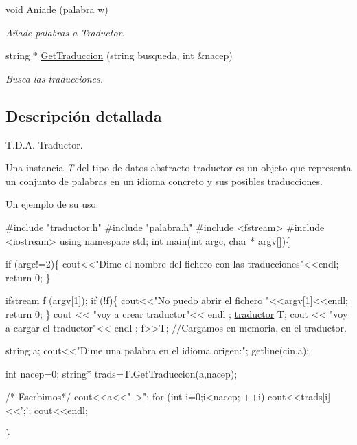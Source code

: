 \begin{DoxyCompactItemize}
void \hyperlink{classtraductor_a7720fe5824d82064b1479ffcc761020e}{Aniade} (\hyperlink{classpalabra}{palabra} w)
\begin{DoxyCompactList}\small\item\em Añade palabras a Traductor. \end{DoxyCompactList}\item 
string $\ast$ \hyperlink{classtraductor_a62c1d8dde134e9122c7172fa6f611e13}{Get\-Traduccion} (string busqueda, int \&nacep)
\begin{DoxyCompactList}\small\item\em Busca las traducciones. \end{DoxyCompactList}\end{DoxyCompactItemize}


\subsection{Descripción detallada}
T.\-D.\-A. Traductor. 

Una instancia {\itshape T} del tipo de datos abstracto {\ttfamily traductor} es un objeto que representa un conjunto de palabras en un idioma concreto y sus posibles traducciones.

Un ejemplo de su uso\-: 
\begin{DoxyCodeInclude}
\textcolor{preprocessor}{#include "\hyperlink{traductor_8h}{traductor.h}"}
\textcolor{preprocessor}{#include "\hyperlink{palabra_8h}{palabra.h}"}
\textcolor{preprocessor}{#include <fstream>}
\textcolor{preprocessor}{#include <iostream>}
\textcolor{keyword}{using namespace }std;
\textcolor{keywordtype}{int} main(\textcolor{keywordtype}{int} argc, \textcolor{keywordtype}{char} * argv[])\{

  \textcolor{keywordflow}{if} (argc!=2)\{
      cout<<\textcolor{stringliteral}{"Dime el nombre del fichero con las traducciones"}<<endl;
      \textcolor{keywordflow}{return} 0;
   \}

   ifstream f (argv[1]);
   \textcolor{keywordflow}{if} (!f)\{
    cout<<\textcolor{stringliteral}{"No puedo abrir el fichero "}<<argv[1]<<endl;
    \textcolor{keywordflow}{return} 0;
   \}
   cout << \textcolor{stringliteral}{"voy a crear traductor"}<< endl ;
   \hyperlink{classtraductor}{traductor} T;
   cout << \textcolor{stringliteral}{"voy a cargar el traductor"}<< endl ;
   f>>T; \textcolor{comment}{//Cargamos en memoria, en el traductor.}
   
   \textcolor{keywordtype}{string} a;
   cout<<\textcolor{stringliteral}{"Dime una palabra en el idioma origen:"};
   getline(cin,a);
   
   \textcolor{keywordtype}{int} nacep=0;
  \textcolor{keywordtype}{string}* trads=T.GetTraduccion(a,nacep);
   
   
   \textcolor{comment}{/* Escrbimos*/}
   cout<<a<<\textcolor{stringliteral}{"-->"};
   \textcolor{keywordflow}{for} (\textcolor{keywordtype}{int} i=0;i<nacep; ++i)
     cout<<trads[i]<<\textcolor{charliteral}{';'};
   cout<<endl;
   
   
   



\}
\end{DoxyCodeInclude}


